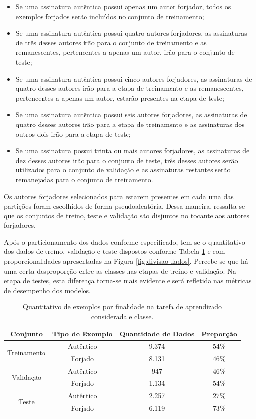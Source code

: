 \begin{itemize}
	\item Se uma assinatura autêntica possui apenas um autor forjador, todos os exemplos forjados serão incluídos no conjunto de treinamento;
	\item Se uma assinatura autêntica possui quatro autores forjadores, as assinaturas de três desses autores irão para o conjunto de treinamento e as remanescentes, pertencentes a apenas um autor, irão para o conjunto de teste;
	\item Se uma assinatura autêntica possui cinco autores forjadores, as assinaturas de quatro desses autores irão para a etapa de treinamento e as remanescentes, pertencentes a apenas um autor, estarão presentes na etapa de teste;
	\item Se uma assinatura autêntica possui seis autores forjadores, as assinaturas de quatro desses autores irão para a etapa de treinamento e as assinaturas dos outros dois irão para a etapa de teste;
	\item Se uma assinatura possui trinta ou mais autores forjadores, as assinaturas de dez desses autores irão para o conjunto de teste, três desses autores serão utilizados para o conjunto de validação e as assinaturas restantes serão remanejadas para o conjunto de treinamento.
\end{itemize}

Os autores forjadores selecionados para estarem presentes em cada uma das partições foram escolhidos de forma pseudoaleatória. Dessa maneira, ressalta-se que os conjuntos de treino, teste e validação são disjuntos no tocante aos autores forjadores.

Após o particionamento dos dados conforme especificado, tem-se o quantitativo dos dados de treino, validação e teste dispostos conforme Tabela \ref{tab:divisao-dados} e com proporcionalidades apresentadas na Figura \ref{fig:divisao-dados}. Percebe-se que há uma certa desproporção entre as classes nas etapas de treino e validação. Na etapa de testes, esta diferença torna-se mais evidente e será refletida nas métricas de desempenho dos modelos.

\begin{table}[h!]
	\centering
	\caption{Quantitativo de exemplos por finalidade na tarefa de aprendizado considerada e classe.}
	\label{tab:divisao-dados}
	\begin{tabular}{c c c c}
		\toprule
		\textbf{Conjunto} & \textbf{Tipo de Exemplo} & \textbf{Quantidade de Dados} & \textbf{Proporção}\\
		\midrule
		\multirow{2}{*}{Treinamento} & Autêntico & 9.374 & $54\%$ \\
    & Forjado & 8.131 & $46\%$\\
     \midrule
		 \multirow{2}{*}{Validação} & Autêntico & 947 & $46\%$ \\
     & Forjado & 1.134 & $54\%$\\
		 \midrule
		 \multirow{2}{*}{Teste} & Autêntico & 2.257 & $27\%$ \\
     & Forjado & 6.119 & $73\%$\\
		\bottomrule
	\end{tabular}
\end{table}

